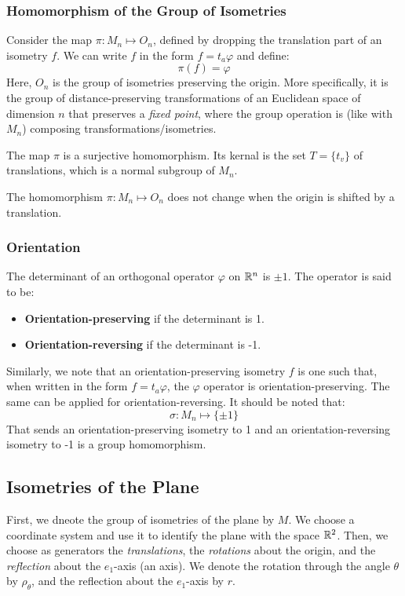 \documentclass[letterpaper]{article}
\begin{document}
\subsubsection{Homomorphism of the Group of Isometries}
Consider the map $\pi: M_n \mapsto O_n$, defined by dropping the translation part of an isometry $f$. We can write $f$ in the form $f = t_a \varphi$ and define: 
\[\pi(f) = \varphi\]
Here, $O_n$ is the group of isometries preserving the origin. More specifically, it is the group of distance-preserving transformations of an Euclidean space of dimension $n$ that preserves a \emph{fixed point}, where the group operation is (like with $M_n$) composing transformations/isometries. 

\bigskip 

\begin{mdframed}
    \begin{proposition}
        The map $\pi$ is a surjective homomorphism. Its kernal is the set $T = \{t_v\}$ of translations, which is a normal subgroup of $M_n$.
    \end{proposition}    
\end{mdframed}

\begin{corollary}{}{}
    The homomorphism $\pi: M_n \mapsto O_n$ does not change when the origin is shifted by a translation. 
\end{corollary}

\subsubsection{Orientation}
The determinant of an orthogonal operator $\varphi$ on $\mathbb{R}^n$ is $\pm 1$. The operator is said to be:
\begin{itemize}
    \item \textbf{Orientation-preserving} if the determinant is 1. 
    \item \textbf{Orientation-reversing} if the determinant is -1. 
\end{itemize}
Similarly, we note that an orientation-preserving isometry $f$ is one such that, when written in the form $f = t_a \varphi$, the $\varphi$ operator is orientation-preserving. The same can be applied for orientation-reversing. It should be noted that: 
\[\sigma: M_n \mapsto \{\pm 1\}\]
That sends an orientation-preserving isometry to 1 and an orientation-reversing isometry to -1 is a group homomorphism. 


\subsection{Isometries of the Plane}
First, we dneote the group of isometries of the plane by $M$. We choose a coordinate system and use it to identify the plane with the space $\mathbb{R}^2$. Then, we choose as generators the \emph{translations}, the \emph{rotations} about the origin, and the \emph{reflection} about the $e_1$-axis (an axis). We denote the rotation through the angle $\theta$ by $\rho_{\theta}$, and the reflection about the $e_1$-axis by $r$. 
\end{document}
